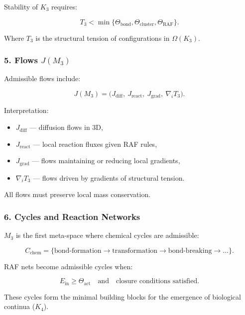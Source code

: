 Stability of $K_3$ requires:

\[
T_3 < \min\{\Theta_{\mathrm{bond}}, \Theta_{\mathrm{cluster}},
\Theta_{\mathrm{RAF}}\}.
\]

Where $T_3$ is the structural tension of configurations in $\Omega(K_3)$.

\subsubsection*{5. Flows \texorpdfstring{$J(M_3)$}{J(M_3)}}

Admissible flows include:

\[
J(M_3) =
\big(
J_{\mathrm{diff}},\
J_{\mathrm{react}},\
J_{\mathrm{grad}},\
\nabla_i T_3
\big).
\]

Interpretation:

\begin{itemize}
    \item $J_{\mathrm{diff}}$ — diffusion flows in 3D,
    \item $J_{\mathrm{react}}$ — local reaction fluxes given RAF rules,
    \item $J_{\mathrm{grad}}$ — flows maintaining or reducing local gradients,
    \item $\nabla_i T_3$ — flows driven by gradients of structural tension.
\end{itemize}

All flows must preserve local mass conservation.

\subsubsection*{6. Cycles and Reaction Networks}

$M_3$ is the first meta-space where chemical cycles are admissible:

\[
C_{\mathrm{chem}}
=
\big\{
\text{bond-formation} \to
\text{transformation} \to
\text{bond-breaking}
\to \dots
\big\}.
\]

RAF nets become admissible cycles when:

\[
E_{\mathrm{in}} \ge \Theta_{\mathrm{act}}
\quad\text{and}\quad
\text{closure conditions satisfied}.
\]

These cycles form the minimal building blocks for the emergence of biological continua ($K_4$).

